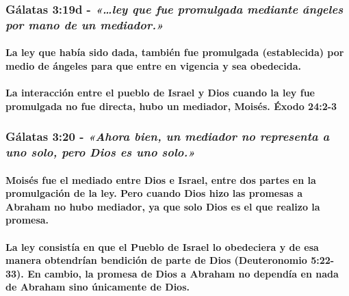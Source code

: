 \documentclass[11a pt,twoside]{article}
\newcommand{\scripture}[1]{%
  {\fontsize{12pt}{16pt}\selectfont\ScriptureFont\itshape #1}%
}
\let\oldsubsubsection\subsubsection
\renewcommand{\subsubsection}{\needspace{4\baselineskip}\oldsubsubsection}
\let\oldparagraph\paragraph
\renewcommand{\paragraph}{\needspace{3\baselineskip}\oldparagraph}
\begin{document}
\subsubsection{\texorpdfstring{Gálatas 3:19d -
\scripture{«…ley que fue promulgada mediante ángeles por mano de un mediador.»}}{Gálatas 3:19d - }}\label{guxe1latas-319d---ley-que-fue-promulgada-mediante-uxe1ngeles-por-mano-de-un-mediador.}

\paragraph{La ley que había sido dada, también fue promulgada
(establecida) por medio de ángeles para que entre en vigencia y sea
obedecida.}\label{la-ley-que-habuxeda-sido-dada-tambiuxe9n-fue-promulgada-establecida-por-medio-de-uxe1ngeles-para-que-entre-en-vigencia-y-sea-obedecida.}

\paragraph{La interacción entre el pueblo de Israel y Dios cuando la ley
fue promulgada no fue directa, hubo un mediador, Moisés. Éxodo
24:2-3}\label{la-interacciuxf3n-entre-el-pueblo-de-israel-y-dios-cuando-la-ley-fue-promulgada-no-fue-directa-hubo-un-mediador-moisuxe9s.-uxe9xodo-242-3}

\subsubsection{\texorpdfstring{Gálatas 3:20 -
\scripture{«Ahora bien, un mediador no representa a uno solo, pero Dios es uno solo.»}}{Gálatas 3:20 - }}\label{guxe1latas-320---ahora-bien-un-mediador-no-representa-a-uno-solo-pero-dios-es-uno-solo.}

\paragraph{Moisés fue el mediado entre Dios e Israel, entre dos partes
en la promulgación de la ley. Pero cuando Dios hizo las promesas a
Abraham no hubo mediador, ya que solo Dios es el que realizo la
promesa.}\label{moisuxe9s-fue-el-mediado-entre-dios-e-israel-entre-dos-partes-en-la-promulgaciuxf3n-de-la-ley.-pero-cuando-dios-hizo-las-promesas-a-abraham-no-hubo-mediador-ya-que-solo-dios-es-el-que-realizo-la-promesa.}

\paragraph{La ley consistía en que el Pueblo de Israel lo obedeciera y
de esa manera obtendrían bendición de parte de Dios (Deuteronomio
5:22-33). En cambio, la promesa de Dios a Abraham no dependía en nada de
Abraham sino únicamente de
Dios.}\label{la-ley-consistuxeda-en-que-el-pueblo-de-israel-lo-obedeciera-y-de-esa-manera-obtendruxedan-bendiciuxf3n-de-parte-de-dios-deuteronomio-522-33.-en-cambio-la-promesa-de-dios-a-abraham-no-dependuxeda-en-nada-de-abraham-sino-uxfanicamente-de-dios.}
\end{document}
